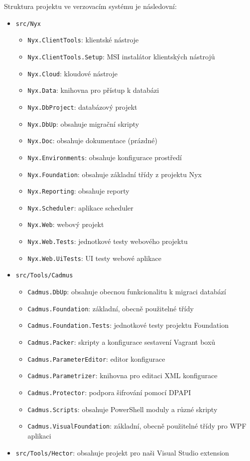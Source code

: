 Struktura projektu ve verzovacím systému je následovní:

\begin{itemize}
\item \texttt{src/Nyx}
\begin{itemize}
\item \texttt{Nyx.ClientTools}: klientské nástroje
\item \texttt{Nyx.ClientTools.Setup}: MSI instalátor klientských nástrojů
\item \texttt{Nyx.Cloud}: kloudové nástroje
\item \texttt{Nyx.Data}: knihovna pro přístup k databázi
\item \texttt{Nyx.DbProject}: databázový projekt
\item \texttt{Nyx.DbUp}: obsahuje migrační skripty
\item \texttt{Nyx.Doc}: obsahuje dokumentace (prázdné)
\item \texttt{Nyx.Environments}: obsahuje konfigurace prostředí
\item \texttt{Nyx.Foundation}: obsahuje základní třídy z projektu Nyx
\item \texttt{Nyx.Reporting}: obsahuje reporty
\item \texttt{Nyx.Scheduler}: aplikace scheduler
\item \texttt{Nyx.Web}: webový projekt
\item \texttt{Nyx.Web.Tests}: jednotkové testy webového projektu
\item \texttt{Nyx.Web.UiTests}: UI testy webové aplikace
\end{itemize}
\item \texttt{src/Tools/Cadmus}
\begin{itemize}
\item \texttt{Cadmus.DbUp}: obsahuje obecnou funkcionalitu k migraci databází
\item \texttt{Cadmus.Foundation}: základní, obecně použitelné třídy
\item \texttt{Cadmus.Foundation.Tests}: jednotkové testy projektu Foundation
\item \texttt{Cadmus.Packer}: skripty a konfigurace sestavení Vagrant boxů
\item \texttt{Cadmus.ParameterEditor}: editor konfigurace
\item \texttt{Cadmus.Parametrizer}: knihovna pro editaci XML konfigurace
\item \texttt{Cadmus.Protector}: podpora šifrování pomocí DPAPI
\item \texttt{Cadmus.Scripts}: obsahuje PowerShell moduly a různé skripty
\item \texttt{Cadmus.VisualFoundation}: základní, obecně použitelné třídy pro WPF aplikaci
\end{itemize}
\item \texttt{src/Tools/Hector}: obsahuje projekt pro naši Visual Studio extension
\end{itemize}

